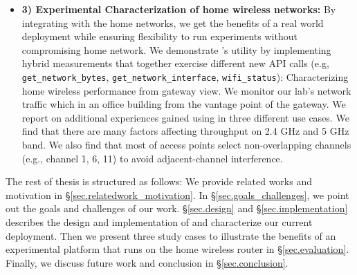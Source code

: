 {\begin{itemize}
\item\textbf{3) Experimental Characterization of home wireless networks:} By integrating \sysname with the home networks, we get the benefits of a real world deployment while ensuring flexibility to run experiments without compromising home network. We demonstrate \sysname's utility by implementing hybrid measurements that together exercise different new API calls (e.g, \texttt{get\_network\_bytes}, \texttt{get\_network\_interface}, \texttt{wifi\_status}): Characterizing home wireless performance from gateway view. We monitor our lab's network traffic which in an office building from the vantage point of the gateway. We report on additional experiences gained using \sysname in three different use cases. We find that there are many factors affecting throughput on 2.4 GHz and 5 GHz band. We also find that most of access points select non-overlapping channels (e.g., channel 1, 6, 11) to avoid adjacent-channel interference. 
\end{itemize}
\par}
The rest of thesis is structured as follows: We provide related works and motivation in \S{\ref{sec.relatedwork_motivation}}. In \S{\ref{sec.goals_challenges}}, we point out the goals and challenges of our work. \S{\ref{sec.design}} and \S{\ref{sec.implementation}} describes the design and implementation of \sysname and characterize our current deployment. Then we present three study cases to illustrate the benefits of an experimental platform that runs on the home wireless router in \S{\ref{sec.evaluation}}. Finally, we discuss future work and conclusion in \S{\ref{sec.conclusion}}. 